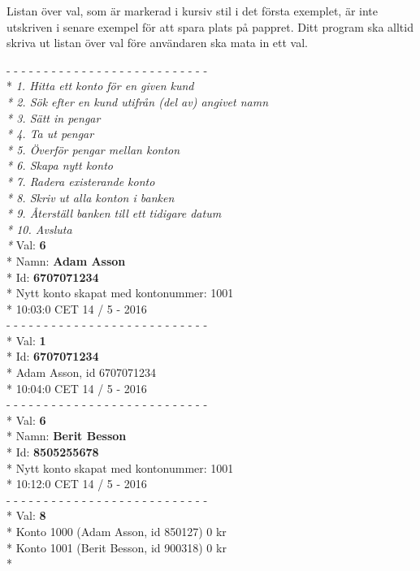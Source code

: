 Listan över val, som är markerad i kursiv stil i det första exemplet, är inte utskriven i senare exempel för att spara plats på pappret. Ditt program ska alltid skriva ut listan över val före användaren ska mata in ett val.
\begin{multicols}{2}
\noindent
- - - - - - - - - - - - - - - - - - - - - - - - - - -\\*
\textit{
1.   Hitta ett konto för en given kund\\*
2.   Sök efter en kund utifrån (del av) angivet namn\\*
3.   Sätt in pengar\\*
4.   Ta ut pengar\\*
5.   Överför pengar mellan konton\\*
6.   Skapa nytt konto\\*
7.   Radera existerande konto\\*
8.   Skriv ut alla konton i banken\\*
9.   Återställ banken till ett tidigare datum\\*
10. Avsluta\\*
}
Val: \textbf{6}\\*
Namn: \textbf{Adam Asson}\\*
Id: \textbf{6707071234}\\*
Nytt konto skapat med kontonummer: 1001\\*
10:03:0 CET 14 / 5 - 2016\\
- - - - - - - - - - - - - - - - - - - - - - - - - - -\\*
Val: \textbf{1}\\*
Id: \textbf{6707071234}\\*
Adam Asson, id 6707071234\\*
10:04:0 CET 14 / 5 - 2016\\
- - - - - - - - - - - - - - - - - - - - - - - - - - -\\*
Val: \textbf{6}\\*
Namn: \textbf{Berit Besson}\\*
Id: \textbf{8505255678}\\*
Nytt konto skapat med kontonummer: 1001\\*
10:12:0 CET 14 / 5 - 2016\\
- - - - - - - - - - - - - - - - - - - - - - - - - - -\\*
Val: \textbf{8}\\*
Konto 1000 (Adam Asson, id 850127) 0 kr\\*
Konto 1001 (Berit Besson, id 900318) 0 kr\\*

\end{multicols}
